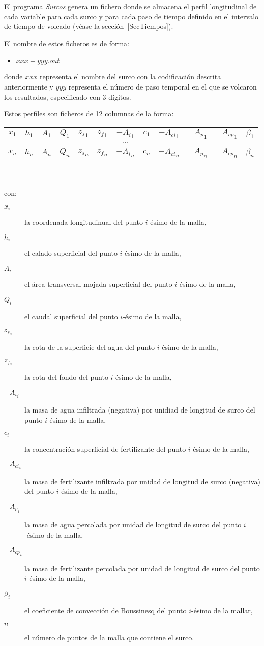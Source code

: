 El programa \emph{Surcos} genera un fichero donde se almacena el perfil
longitudinal de cada variable para cada surco y para cada paso de tiempo
definido en el intervalo de tiempo de volcado (véase la
sección~\ref{SecTiempos}).

El nombre de estos ficheros es de forma:
\begin{itemize}
\item $xxx-yyy.out$
\end{itemize}
donde $xxx$ representa el nombre del surco con la codificación descrita
anteriormente y $yyy$ representa el número de paso temporal en el que se
volcaron los resultados, especificado con 3 dígitos.

Estos perfiles son ficheros de 12 columnas de la forma:\\
\begin{tabular}{cccccccccccc}
$x_1$& $h_1$& $A_1$& $Q_1$& ${z_s}_1$& ${z_f}_1$& $-{A_i}_1$& $c_1$&
	$-{A_{ci}}_1$& $-{A_p}_1$& $-{A_{cp}}_1$& $\beta_1$\\
&&&&&&$\cdots$\\
$x_n$& $h_n$& $A_n$& $Q_n$& ${z_s}_n$& ${z_f}_n$& $-{A_i}_n$& $c_n$&
	$-{A_{ci}}_n$& $-{A_p}_n$& $-{A_{cp}}_n$& $\beta_n$
\end{tabular}\\\\
con:
\begin{description}
\item[$x_i$] la coordenada longitudinual del punto $i$-ésimo de la malla,
\item[$h_i$] el calado superficial del punto $i$-ésimo de la malla,
\item[$A_i$] el área transversal mojada superficial del punto $i$-ésimo de la
	malla,
\item[$Q_i$] el caudal superficial del punto $i$-ésimo de la malla,
\item[${z_s}_i$] la cota de la superficie del agua del punto $i$-ésimo de la
	malla,
\item[${z_f}_i$] la cota del fondo del punto $i$-ésimo de la malla,
\item[$-{A_i}_i$] la masa de agua infiltrada (negativa) por unidiad de longitud
	de surco del punto $i$-ésimo de la malla,
\item[$c_i$] la concentración superficial de fertilizante del punto $i$-ésimo de
	la malla,
\item[$-{A_{ci}}_i$] la masa de fertilizante infiltrada por unidad de longitud
	de surco (negativa) del punto $i$-ésimo de la malla,
\item[$-{A_p}_i$] la masa de agua percolada por unidad de longitud de surco del
	punto $i$-ésimo de la malla,
\item[$-{A_{cp}}_i$] la masa de fertilizante percolada por unidad de longitud
	de surco del punto $i$-ésimo de la malla,
\item[$\beta_i$] el coeficiente de convección de Boussinesq del punto $i$-ésimo
	de la mallar,
\item[$n$] el número de puntos de la malla que contiene el surco.
\end{description}

